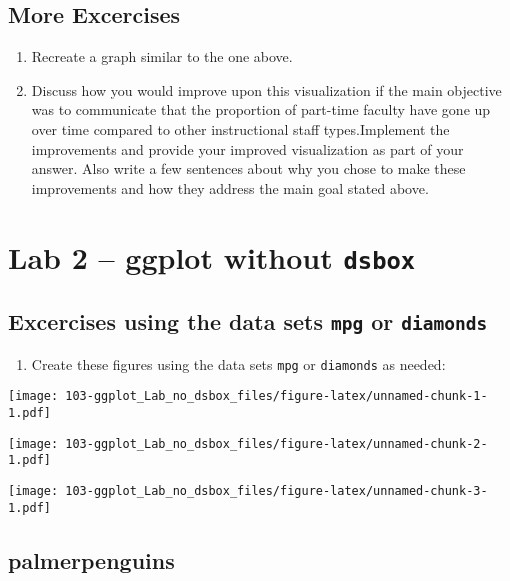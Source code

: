 \documentclass[
]{book}
\providecommand{\tightlist}{%
  \setlength{\itemsep}{0pt}\setlength{\parskip}{0pt}}
\begin{document}
\hypertarget{more-excercises}{%
\section{More Excercises}\label{more-excercises}}

\begin{enumerate}
\def\labelenumi{\arabic{enumi}.}
\setcounter{enumi}{7}
\item
  Recreate a graph similar to the one above.
\item
  Discuss how you would improve upon this visualization if the main objective was to communicate that the proportion of part-time faculty have gone up over time compared to other instructional staff types.Implement the improvements and provide your improved visualization as part of your answer. Also write a few sentences about why you chose to make these improvements and how they address the main goal stated above.
\end{enumerate}

\hypertarget{lab-2-ggplot-without-dsbox}{%
\chapter{\texorpdfstring{Lab 2 -- ggplot without \texttt{dsbox}}{Lab 2 -- ggplot without dsbox}}\label{lab-2-ggplot-without-dsbox}}

\hypertarget{excercises-using-the-data-sets-mpg-or-diamonds}{%
\section{\texorpdfstring{Excercises using the data sets \texttt{mpg} or \texttt{diamonds}}{Excercises using the data sets mpg or diamonds}}\label{excercises-using-the-data-sets-mpg-or-diamonds}}

\begin{enumerate}
\def\labelenumi{\arabic{enumi}.}
\tightlist
\item
  Create these figures using the data sets \texttt{mpg} or \texttt{diamonds} as needed:
\end{enumerate}

\texttt{[image: 103-ggplot\_Lab\_no\_dsbox\_files/figure-latex/unnamed-chunk-1-1.pdf]}

\texttt{[image: 103-ggplot\_Lab\_no\_dsbox\_files/figure-latex/unnamed-chunk-2-1.pdf]}

\texttt{[image: 103-ggplot\_Lab\_no\_dsbox\_files/figure-latex/unnamed-chunk-3-1.pdf]}

\hypertarget{palmerpenguins}{%
\section{palmerpenguins}\label{palmerpenguins}}
\end{document}
